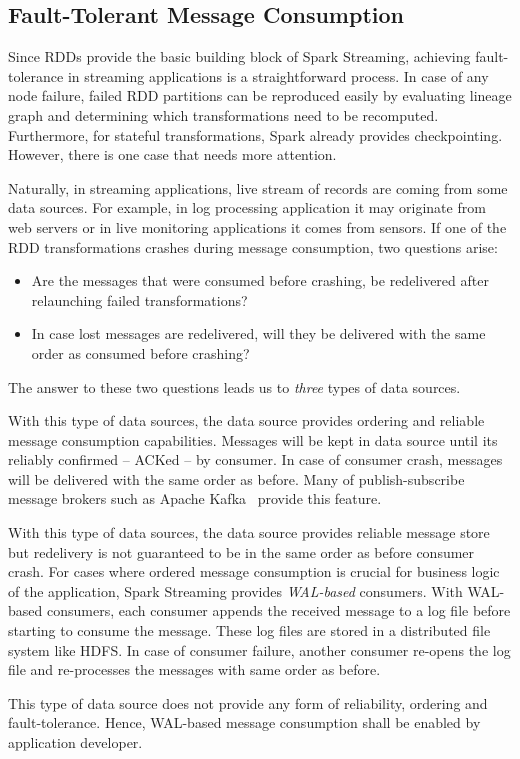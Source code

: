 \clearpage
\subsection{Fault-Tolerant Message Consumption}
Since RDDs provide the basic building block of Spark Streaming, achieving fault-tolerance in streaming applications is a straightforward process. In case of any node failure, failed RDD partitions can be reproduced easily by evaluating lineage graph and determining which transformations need to be recomputed. Furthermore, for stateful transformations, Spark already provides checkpointing. However, there is one case that needs more attention.

Naturally, in streaming applications, live stream of records are coming from some data sources. For example, in log processing application it may originate from web servers or in live monitoring applications it comes from sensors. If one of the RDD transformations crashes during message consumption, two questions arise:
\begin{itemize}
    \item Are the messages that were consumed before crashing, be redelivered after relaunching failed transformations?
    \item In case lost messages are redelivered, will they be delivered with the same order as consumed before crashing?
\end{itemize}
The answer to these two questions leads us to \emph{three} types of data sources.
\begin{description}[leftmargin=0pt]
    \item[Reliable Ordered] With this type of data sources, the data source provides ordering and reliable message consumption capabilities. Messages will be kept in data source until its reliably confirmed -- ACKed -- by consumer. In case of consumer crash, messages will be delivered with the same order as before. Many of publish-subscribe message brokers such as Apache Kafka~\cite{kafka} provide this feature.
    \item[Reliable Unordered] With this type of data sources, the data source provides reliable message store but redelivery is not guaranteed to be in the same order as before consumer crash. For cases where ordered message consumption is crucial for business logic of the application, Spark Streaming provides \emph{WAL-based} consumers. With WAL-based consumers, each consumer appends the received message to a log file before starting to consume the message. These log files are stored in a distributed file system like HDFS. In case of consumer failure, another consumer re-opens the log file and re-processes the messages with same order as before.
    \item[Unreliable] This type of data source does not provide any form of reliability, ordering and fault-tolerance. Hence, WAL-based message consumption shall be enabled by application developer.
\end{description}

